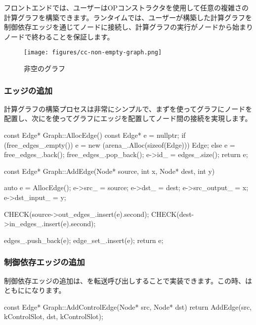 \begin{content}
フロントエンドでは、ユーザーはOPコンストラクタを使用して任意の複雑さの計算グラフを構築できます。ランタイムでは、ユーザーが構築した計算グラフを制御依存エッジを通じてノードに接続し、計算グラフの実行がノードから始まりノードで終わることを保証します。

\begin{figure}[H]
\centering
\texttt{[image: figures/cc-non-empty-graph.png]}
\caption{非空のグラフ}
 \label{fig:cc-non-empty-graph}
\end{figure}

\subsubsection{エッジの追加}

計算グラフの構築プロセスは非常にシンプルで、まずを使ってグラフにノードを配置し、次にを使ってグラフにエッジを配置してノード間の接続を実現します。

\begin{leftbar}
\begin{c++}
const Edge* Graph::AllocEdge() const {
  Edge* e = nullptr;
  if (free_edges_.empty()) {
    e = new (arena_.Alloc(sizeof(Edge))) Edge;
  } else {
    e = free_edges_.back();
    free_edges_.pop_back();
  }
  e->id_ = edges_.size();
  return e;
}

const Edge* Graph::AddEdge(Node* source, int x, Node* dest, int y) {
  auto e = AllocEdge();
  e->src_ = source;
  e->dst_ = dest;
  e->src_output_ = x;
  e->dst_input_ = y;

  CHECK(source->out_edges_.insert(e).second);
  CHECK(dest->in_edges_.insert(e).second);

  edges_.push_back(e);
  edge_set_.insert(e);
  return e;
}
\end{c++}
\end{leftbar}

\subsubsection{制御依存エッジの追加}

制御依存エッジの追加は、を転送呼び出しすることで実装できます。この時、はともにになります。

\begin{leftbar}
\begin{c++}
const Edge* Graph::AddControlEdge(Node* src, Node* dst) {
  return AddEdge(src, kControlSlot, dst, kControlSlot);
}
\end{c++}
\end{leftbar}


\end{content}
